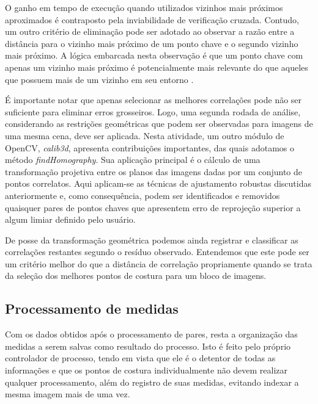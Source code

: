 O ganho em tempo de execução quando utilizados vizinhos mais próximos aproximados é contraposto pela inviabilidade de verificação cruzada. Contudo, um outro critério de eliminação pode ser adotado ao observar a razão entre a distância para o vizinho mais próximo de um ponto chave e o segundo vizinho mais próximo. A lógica embarcada nesta observação é que um ponto chave com apenas um vizinho mais próximo é potencialmente mais relevante do que aqueles que possuem mais de um vizinho em seu entorno \cite{SIFT2004}.

É importante notar que apenas selecionar as melhores correlações pode não ser suficiente para eliminar erros grosseiros. Logo, uma segunda rodada de análise, considerando as restrições geométricas que podem ser observadas para imagens de uma mesma cena, deve ser aplicada. Nesta atividade, um outro módulo de OpenCV, \textit{calib3d}, apresenta contribuições importantes, das quais adotamos o método \textit{findHomography}. Sua aplicação principal é o cálculo de uma transformação projetiva entre os planos das imagens dadas por um conjunto de pontos correlatos. Aqui aplicam-se as técnicas de ajustamento robustas discutidas anteriormente e, como consequência, podem ser identificados e removidos quaisquer pares de pontos chaves que apresentem erro de reprojeção superior a algum limiar definido pelo usuário.

De posse da transformação geométrica podemos ainda registrar e classificar as correlações restantes segundo o resíduo observado. Entendemos que este pode ser um critério melhor do que a distância de correlação propriamente quando se trata da seleção dos melhores pontos de costura para um bloco de imagens.



\subsection{Processamento de medidas}

Com os dados obtidos após o processamento de pares, resta a organização das medidas a serem salvas como resultado do processo. Isto é feito pelo próprio controlador de processo, tendo em vista que ele é o detentor de todas as informações e que os pontos de costura individualmente não devem realizar qualquer processamento, além do registro de suas medidas, evitando indexar a mesma imagem mais de uma vez. 

